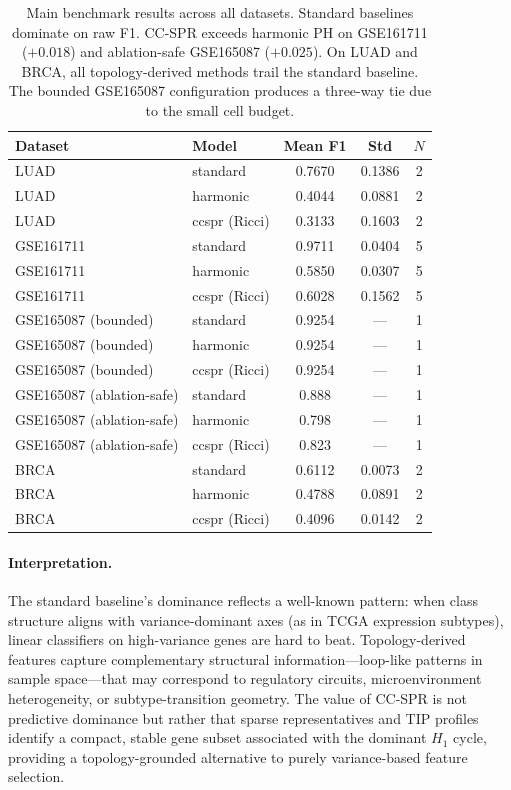 \documentclass[11pt]{article}
\begin{document}
\begin{table}[h]
\centering
\small
\begin{tabular}{llccc}
\toprule
Dataset & Model & Mean F1 & Std & $N$ \\
\midrule
LUAD & standard & 0.7670 & 0.1386 & 2 \\
LUAD & harmonic & 0.4044 & 0.0881 & 2 \\
LUAD & ccspr (Ricci) & 0.3133 & 0.1603 & 2 \\
\midrule
GSE161711 & standard & 0.9711 & 0.0404 & 5 \\
GSE161711 & harmonic & 0.5850 & 0.0307 & 5 \\
GSE161711 & ccspr (Ricci) & 0.6028 & 0.1562 & 5 \\
\midrule
GSE165087 (bounded) & standard & 0.9254 & --- & 1 \\
GSE165087 (bounded) & harmonic & 0.9254 & --- & 1 \\
GSE165087 (bounded) & ccspr (Ricci) & 0.9254 & --- & 1 \\
\midrule
GSE165087 (ablation-safe) & standard & 0.888 & --- & 1 \\
GSE165087 (ablation-safe) & harmonic & 0.798 & --- & 1 \\
GSE165087 (ablation-safe) & ccspr (Ricci) & 0.823 & --- & 1 \\
\midrule
BRCA & standard & 0.6112 & 0.0073 & 2 \\
BRCA & harmonic & 0.4788 & 0.0891 & 2 \\
BRCA & ccspr (Ricci) & 0.4096 & 0.0142 & 2 \\
\bottomrule
\end{tabular}
\caption{Main benchmark results across all datasets.
Standard baselines dominate on raw F1.
CC-SPR exceeds harmonic PH on GSE161711 ($+0.018$) and ablation-safe GSE165087 ($+0.025$).
On LUAD and BRCA, all topology-derived methods trail the standard baseline.
The bounded GSE165087 configuration produces a three-way tie due to the small cell budget.}
\label{tab:mainbench}
\end{table}

\paragraph{Interpretation.}
The standard baseline's dominance reflects a well-known pattern: when class structure aligns with variance-dominant axes (as in TCGA expression subtypes), linear classifiers on high-variance genes are hard to beat.
Topology-derived features capture complementary structural information---loop-like patterns in sample space---that may correspond to regulatory circuits, microenvironment heterogeneity, or subtype-transition geometry.
The value of CC-SPR is not predictive dominance but rather that sparse representatives and TIP profiles identify a compact, stable gene subset associated with the dominant $H_1$ cycle, providing a topology-grounded alternative to purely variance-based feature selection.
\end{document}

